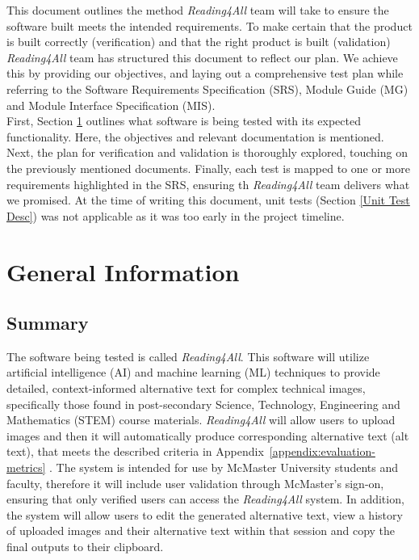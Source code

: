 \documentclass[12pt, titlepage]{article}
\begin{document}
\newpage


\noindent This document outlines the method \textit{Reading4All} team will take to
ensure the software built meets the intended requirements. To make
certain that the product is built correctly (verification) and that
the right product is built (validation) \textit{Reading4All} team has structured this
document to reflect our plan. We achieve this by providing our objectives,
and laying out a comprehensive test plan while referring to the
Software Requirements Specification (SRS), Module
Guide (MG) and Module Interface Specification (MIS). \\

First, Section \ref{geninfo} outlines what software is being tested
with its expected functionality. Here, the objectives and relevant
documentation is mentioned. Next, the plan for verification and
validation is thoroughly explored, touching on the previously
mentioned documents. Finally, each test is mapped to one or more
requirements highlighted in the SRS, ensuring th \textit{Reading4All} team delivers what we promised. At the time
of writing this document, unit tests (Section \ref{Unit Test Desc})
was not applicable as it was too early in the project timeline.\\

\section{General Information} \label{geninfo}

\subsection{Summary}

The software being tested is called \textit{Reading4All}. This
software will utilize artificial intelligence (AI) and machine
learning (ML) techniques to provide detailed, context-informed
alternative text for complex technical images, specifically those
found in post-secondary Science, Technology, Engineering and Mathematics (STEM)
course materials. \textit{Reading4All} will allow users to upload
images and then it will automatically produce corresponding
alternative text (alt text), that
meets the described criteria in
Appendix~\ref{appendix:evaluation-metrics} . The system is intended for use by
McMaster University students and faculty, therefore it will include
user validation through McMaster's sign-on, ensuring that only
verified users can access the \textit{Reading4All} system.
In addition, the system will allow users to edit the generated
alternative text, view a history of uploaded images and their
alternative text within that session and copy the final outputs
to their clipboard.
\end{document}
